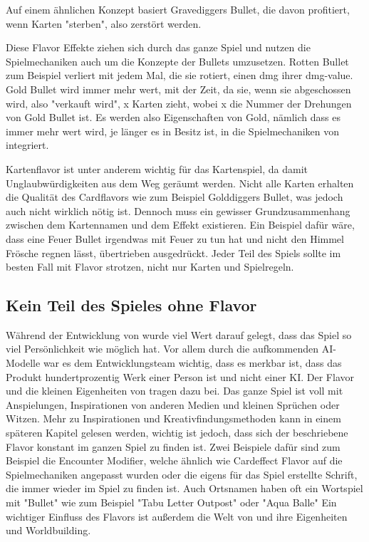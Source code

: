 Auf einem ähnlichen Konzept basiert Gravediggers Bullet, die davon profitiert, wenn Karten "sterben", also zerstört werden.


Diese Flavor Effekte ziehen sich durch das ganze Spiel und nutzen die Spielmechaniken auch um die Konzepte der Bullets umzusetzen.
Rotten Bullet zum Beispiel verliert mit jedem Mal, die sie rotiert, einen dmg ihrer dmg-value. Gold Bullet wird immer mehr
wert, mit der Zeit, da sie, wenn sie abgeschossen wird, also "verkauft wird", x Karten zieht, wobei x die Nummer der Drehungen
von Gold Bullet ist. Es werden also Eigenschaften von Gold, nämlich dass es immer mehr wert wird, je länger es in Besitz ist,
in die Spielmechaniken von \FF integriert.


Kartenflavor ist unter anderem wichtig für das Kartenspiel, da damit Unglaubwürdigkeiten aus dem Weg geräumt werden.
Nicht alle Karten erhalten die Qualität des Cardflavors wie zum Beispiel Golddiggers Bullet, was jedoch auch nicht wirklich nötig ist.
Dennoch muss ein gewisser Grundzusammenhang zwischen dem Kartennamen und dem Effekt existieren.
Ein Beispiel dafür wäre, dass eine Feuer Bullet irgendwas mit Feuer zu tun hat und nicht den Himmel Frösche regnen lässt,
übertrieben ausgedrückt. Jeder Teil des Spiels sollte im besten Fall mit Flavor strotzen, nicht nur Karten und Spielregeln.



\subsection{Kein Teil des Spieles ohne Flavor}\label{subsec:keinTeildesSpielesOhneFlavor}

Während der Entwicklung von \FF wurde viel Wert darauf gelegt, dass das Spiel so viel Persönlichkeit wie möglich hat.
Vor allem durch die aufkommenden AI-Modelle war es dem Entwicklungsteam wichtig, dass es merkbar ist,
dass das Produkt hundertprozentig Werk einer Person ist und nicht einer KI.
Der Flavor und die kleinen Eigenheiten von \FF tragen dazu bei.
Das ganze Spiel ist voll mit Anspielungen, Inspirationen von anderen Medien und kleinen Sprüchen oder Witzen. Mehr zu Inspirationen und Kreativfindungsmethoden
kann in einem späteren Kapitel gelesen werden, wichtig ist jedoch, dass sich der beschriebene Flavor konstant im ganzen Spiel zu finden ist.
Zwei Beispiele dafür sind zum Beispiel die Encounter Modifier, welche ähnlich wie Cardeffect Flavor auf die Spielmechaniken
angepasst wurden oder die eigens für das Spiel erstellte Schrift, die immer wieder im Spiel zu finden ist. Auch Ortsnamen
haben oft ein Wortspiel mit "Bullet" wie zum Beispiel "Tabu Letter Outpost" oder "Aqua Balle"
Ein wichtiger Einfluss des Flavors ist außerdem die Welt von \FF und ihre Eigenheiten und Worldbuilding.



